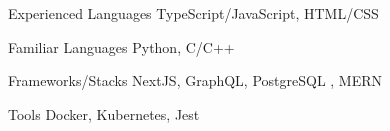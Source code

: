 

\begin{cvskills}

  \cvskill
  {Experienced Languages} %
  {TypeScript/JavaScript, HTML/CSS} %

  \cvskill
  {Familiar Languages} %
  {Python, C/C++} %

  \cvskill
  {Frameworks/Stacks} %
  { NextJS, GraphQL, PostgreSQL , MERN} %

  \cvskill
  {Tools} %
  { Docker, Kubernetes, Jest} %

\end{cvskills}